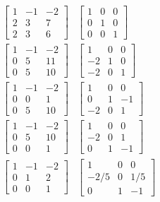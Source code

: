 \documentclass[fleqn,draft,a5paper]{article}
\theoremstyle{remark}
\begin{document}
\begin{align*}
  \begin{bmatrix}
    1 & -1 & -2 \\ 2 & 3 & 7 \\ 2 & 3 & 6
  \end{bmatrix}
  &
    \begin{bmatrix}
      1 & 0 & 0 \\ 0 & 1  & 0 \\ 0 & 0 & 1
    \end{bmatrix}\\
  \begin{bmatrix}
    1 & -1 & -2 \\ 0 & 5 & 11 \\ 0 & 5 & 10
  \end{bmatrix}
  &
    \begin{bmatrix}
      1 & 0 & 0 \\ -2 & 1 & 0 \\ -2 & 0 & 1
    \end{bmatrix}\\
  \begin{bmatrix}
    1 & -1 & -2 \\ 0 & 0 & 1 \\ 0 & 5& 10 
  \end{bmatrix}
  &
    \begin{bmatrix}
      1 & 0 & 0 \\ 0 & 1 & -1 \\ -2 & 0 & 1
    \end{bmatrix}\\
  \begin{bmatrix}
    1 & -1 & -2 \\ 0 & 5 & 10 \\ 0 & 0& 1
  \end{bmatrix}
  &
    \begin{bmatrix}
      1 & 0 & 0 \\ -2 & 0 & 1 \\ 0 & 1 & -1
    \end{bmatrix}\\
  \begin{bmatrix}
    1 & -1 & -2 \\ 0 & 1 & 2 \\ 0 & 0 & 1
  \end{bmatrix}
  &
    \begin{bmatrix}
      1 & 0 & 0 \\ -2/5 & 0 & 1/5 \\ 0 & 1 & -1
    \end{bmatrix}\\

\end{align*}
\end{document}
